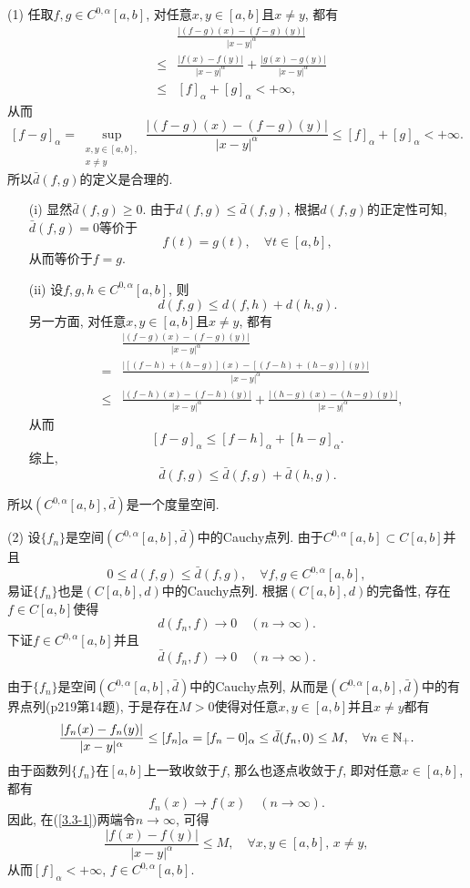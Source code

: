 \documentclass[UTF8,oneside,12pt]{article}  %
\makeatletter
\theoremstyle{DingLi1}
\numberwithin{equation}{section}
\theoremstyle{DingLi2}
\renewenvironment{proof}[1][\proofname]{\par%
\pushQED{\qed}%
\normalfont \topsep6\p@\@plus6\p@\relax%
\trivlist%
\item[\hskip\labelsep%
#1]\ignorespaces%
}{%
\popQED\endtrivlist\@endpefalse%
}
\renewcommand{\proofname}{\heiti\large\color{blue} 证明}%
\makeatother
\begin{document}
\begin{proof}
(1) 任取$f,g\in C^{0,\alpha}[a,b]$, 对任意$x,y\in [a,b]$且$x\neq y$, 都有
\begin{eqnarray*}
&&\frac{|(f-g)(x)-(f-g)(y)|}{|x-y|^\alpha} \\
&\leq& \frac{|f(x)-f(y)|}{|x-y|^\alpha}+\frac{|g(x)-g(y)|}{|x-y|^\alpha}\\
&\leq &[f]_{\alpha}+[g]_{\alpha}<+\infty,
\end{eqnarray*}
从而
$$[f-g]_{\alpha}=\sup_{\substack{x,y\in[a,b],\\ x\neq y}}\frac{|(f-g)(x)-(f-g)(y)|}{|x-y|^\alpha}\leq [f]_{\alpha}+[g]_{\alpha}<+\infty.$$
所以$\bar{d}(f,g)$的定义是合理的.
\begin{itemize}
  \item[(i)]显然$\bar{d}(f,g)\geq 0$. 由于$d(f,g)\leq \bar{d}(f,g)$, 根据$d(f,g)$的正定性可知, $\bar{d}(f,g)=0$等价于
      $$f(t)=g(t),\quad \forall t\in [a,b],$$
      从而等价于$f=g$.
      \item[(ii)]设$f,g,h\in C^{0,\alpha}[a,b]$, 则
      $$d(f,g)\leq d(f,h)+d(h,g).$$
      另一方面, 对任意$x,y\in [a,b]$且$x\neq y$, 都有
      \begin{eqnarray*}
      &&\frac{|(f-g)(x)-(f-g)(y)|}{|x-y|^\alpha}\\
      &=&\frac{\big|[(f-h)+(h-g)](x)-[(f-h)+(h-g)](y)\big|}{|x-y|^\alpha}\\
      &\leq&\frac{|(f-h)(x)-(f-h)(y)|}{|x-y|^\alpha}+\frac{|(h-g)(x)-(h-g)(y)|}{|x-y|^\alpha},
      \end{eqnarray*}
      从而
      $$[f-g]_{\alpha}\leq [f-h]_{\alpha}+[h-g]_{\alpha}.$$
      综上,
      $$\bar{d}(f,g)\leq \bar{d}(f,g)+\bar{d}(h,g).$$
\end{itemize}
所以$(C^{0,\alpha}[a,b],\bar{d})$是一个度量空间.

(2) 设$\{f_n\}$是空间$(C^{0,\alpha}[a,b],\bar{d})$中的Cauchy点列. 由于$C^{0,\alpha}[a,b]\subset C[a,b]$并且
$$0\leq d(f,g)\leq  \bar{d}(f,g), \quad\forall f,g\in C^{0,\alpha}[a,b],$$
易证$\{f_n\}$也是$(C[a,b],d)$中的Cauchy点列. 根据$(C[a,b],d)$的完备性, 存在$f\in C[a,b]$使得
$$d(f_n,f)\to 0\quad (n\to \infty).$$
下证$f\in C^{0,\alpha}[a,b]$并且
$$\bar{d}(f_n,f)\to 0\quad (n\to \infty).$$

由于$\{f_n\}$是空间$(C^{0,\alpha}[a,b],\bar{d})$中的Cauchy点列, 从而是$(C^{0,\alpha}[a,b],\bar{d})$中的有界点列(p219第14题), 于是存在$M>0$使得对任意$x,y\in [a,b]$并且$x\neq y$都有
\begin{equation}\label{3.3-1}
\frac{|f_n(x)-f_n(y)|}{|x-y|^\alpha}\leq [f_n]_\alpha =[f_n-0]_\alpha \leq \bar{d}(f_n,0)\leq M,\quad \forall n\in \Bbb{N}_+.
\end{equation}
由于函数列$\{f_n\}$在$[a,b]$上一致收敛于$f$, 那么也逐点收敛于$f$, 即对任意$x\in [a,b]$, 都有
\begin{equation}\label{3.3-2}
f_n(x)\to f(x)\quad (n\to \infty).
\end{equation}
因此, 在(\ref{3.3-1})两端令$n\to \infty$, 可得
$$\frac{|f(x)-f(y)|}{|x-y|^\alpha}\leq M,\quad \forall x,y\in [a,b],\,x\neq y,$$
从而$[f]_\alpha <+\infty$, $f\in C^{0,\alpha}[a,b]$.


\end{proof}
\end{document}
